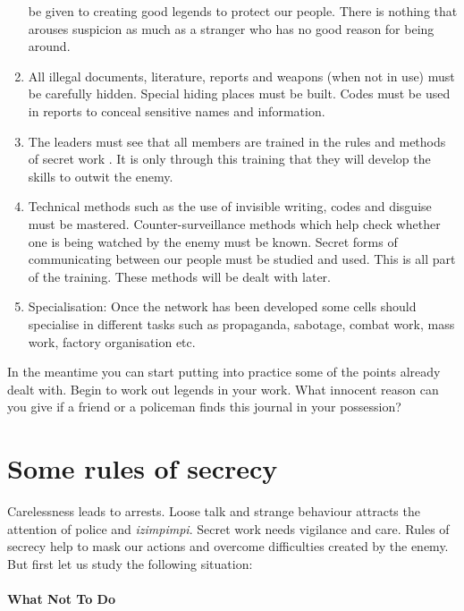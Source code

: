 \begin{enumerate}
  be given to creating good legends to protect our people. There is
  nothing that arouses suspicion as much as a stranger who has no good
  reason for being around.
\item
  All illegal documents, literature, reports and weapons (when not in
  use) must be carefully hidden. Special hiding places must be built.
  Codes must be used in reports to conceal sensitive names and
  information.
\item
  The leaders must see that all members are trained in the rules and
  methods of secret work . It is only through this training that they
  will develop the skills to outwit the enemy.
\item
  Technical methods such as the use of invisible writing, codes and
  disguise must be mastered. Counter-surveillance methods which help
  check whether one is being watched by the enemy must be known. Secret
  forms of communicating between our people must be studied and used.
  This is all part of the training. These methods will be dealt with
  later.
\item
  Specialisation: Once the network has been developed some cells should
  specialise in different tasks such as propaganda, sabotage, combat
  work, mass work, factory organisation etc.
\end{enumerate}

In the meantime you can start putting into practice some of the points
already dealt with. Begin to work out legends in your work. What
innocent reason can you give if a friend or a policeman finds this
journal in your possession?

\section{Some rules of secrecy}

Carelessness leads to arrests. Loose talk and strange behaviour attracts
the attention of police and \emph{izimpimpi}. Secret work needs
vigilance and care. Rules of secrecy help to mask our actions and
overcome difficulties created by the enemy. But first let us study the
following situation:

\paragraph{What Not To Do}

